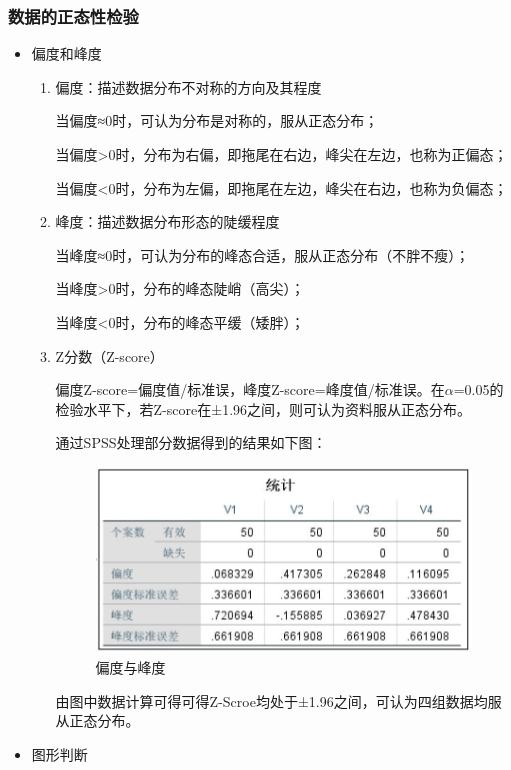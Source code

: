 \documentclass[UTF8]{ctexart}
\begin{document}
	\subsubsection{数据的正态性检验}
	\begin{itemize}
		\item 偏度和峰度
		\begin{enumerate}
			\item 偏度：描述数据分布不对称的方向及其程度
			
			当偏度≈0时，可认为分布是对称的，服从正态分布；
			
			当偏度>0时，分布为右偏，即拖尾在右边，峰尖在左边，也称为正偏态；
			
			当偏度<0时，分布为左偏，即拖尾在左边，峰尖在右边，也称为负偏态；
			
			\item 峰度：描述数据分布形态的陡缓程度
			
			当峰度≈0时，可认为分布的峰态合适，服从正态分布（不胖不瘦）；
			
			当峰度>0时，分布的峰态陡峭（高尖）；
			
			当峰度<0时，分布的峰态平缓（矮胖）；
			
			\item Z分数（Z-score） 
			
			\qquad 偏度Z-score=偏度值/标准误，峰度Z-score=峰度值/标准误。在$\alpha$=0.05的检验水平下，若Z-score在±1.96之间，则可认为资料服从正态分布。
			
			\qquad 通过SPSS处理部分数据得到的结果如下图：	
			\begin{figure}[H]
				\centering %
				\includegraphics[scale=0.5]{1_piandu.jpg}
				\caption{偏度与峰度}
			\end{figure}
			\qquad 由图中数据计算可得可得Z-Scroe均处于±1.96之间，可认为四组数据均服从正态分布。			
		\end{enumerate}
		\item 图形判断
		

\end{itemize}
\end{document}
